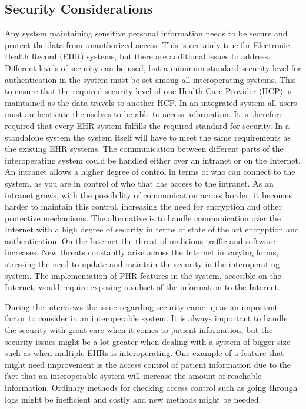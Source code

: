 \documentclass[14pt]{article}
\begin{document}
\subsection{Security Considerations}
\label{sec:resultsSecurity}
Any system maintaining sensitive personal information needs to be secure and protect the data from unauthorized access. This is certainly true for Electronic Health Record (EHR) systems, but there are additional issues to address. Different levels of security can be used, but a minimum standard security level for authentication in the system must be set among all interoperating systems. This to ensure that the required security level of one Health Care Provider (HCP) is maintained as the data travels to another HCP. In an integrated system all users must authenticate themselves to be able to access information. It is therefore required that every EHR system fulfills the required standard for security. In a standalone system the system itself will have to meet the same requirements as the existing EHR systems. The communication between different parts of the interoperating system could be handled either over an intranet or on the Internet. An intranet allows a higher degree of control in terms of who can connect to the system, as you are in control of who that has access to the intranet. As an intranet grows, with the possibility of communication across border, it becomes harder to maintain this control, increasing the need for encryption and other protective mechanisms. The alternative is to handle communication over the Internet with a high degree of security in terms of state of the art encryption and authentication. On the Internet the threat of malicious traffic and software increases. New threats constantly arise across the Internet in varying forms, stressing the need to update and maintain the security in the interoperating system.
The implementation of \gls{PHR} features in the system, accesible on the Internet, would require exposing a subset of the information to the Internet.

During the interviews the issue regarding security came up as an important factor to consider in an interoperable system. It is always important to handle the security with great care when it comes to patient information, but the security issues might be a lot greater when dealing with a system of bigger size such as when multiple EHRs is interoperating. One example of a feature that might need improvement is the access control of patient information due to the fact that an interoperable system will increase the amount of reachable information. Ordinary methods for checking access control such as going through logs might be inefficient and costly and new methods might be needed.
\end{document}

